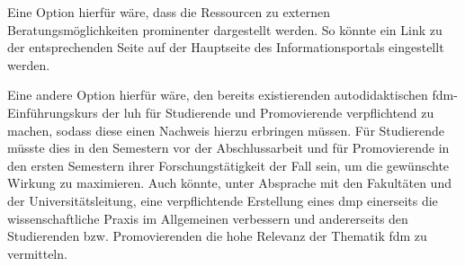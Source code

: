 Eine Option hierfür wäre, dass die Ressourcen zu externen Beratungsmöglichkeiten prominenter dargestellt werden.
So könnte ein Link zu der entsprechenden Seite auf der Hauptseite des Informationsportals eingestellt werden.

Eine andere Option hierfür wäre, den bereits existierenden autodidaktischen \gls{fdm}-Einführungskurs der \gls{luh} für Studierende und Promovierende verpflichtend zu machen, sodass diese einen Nachweis hierzu erbringen müssen.
Für Studierende müsste dies in den Semestern vor der Abschlussarbeit und für Promovierende in den ersten Semestern ihrer Forschungstätigkeit der Fall sein, um die gewünschte Wirkung zu maximieren.
Auch könnte, unter Absprache mit den Fakultäten und der Universitätsleitung, eine verpflichtende Erstellung eines \gls{dmp} einerseits die wissenschaftliche Praxis im Allgemeinen verbessern und andererseits den Studierenden bzw. Promovierenden die hohe Relevanz der Thematik \gls{fdm} zu vermitteln.

